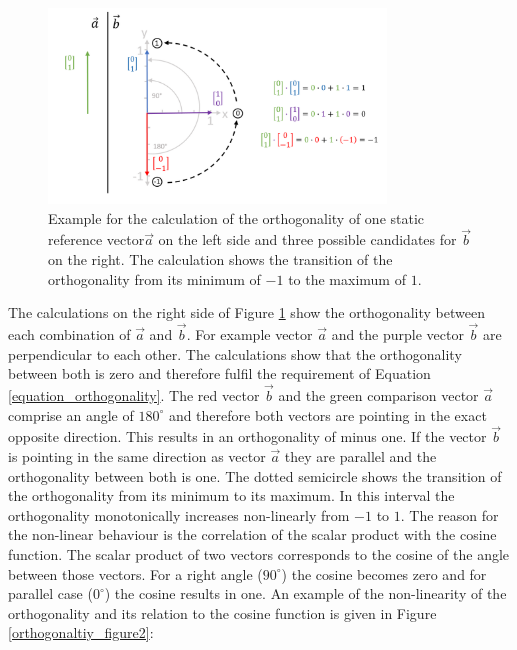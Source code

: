 \begin{figure}[H]
    \centering
    \includegraphics[width=0.8\textwidth]{Graphics/orthogonality.png}
    \caption{Example for the calculation of the orthogonality of one static reference vector$\overrightarrow{a}$ on the left side and three possible candidates for $\overrightarrow{b}$ on the right. The calculation shows the transition of the orthogonality from its minimum of $-1$ to the maximum of $1$.}
    \label{orthogonaltiy_figure}
\end{figure}

The calculations on the right side of Figure \ref{orthogonaltiy_figure} show the orthogonality between each combination of $\overrightarrow{a}$ and $\overrightarrow{b}$. For example vector $\overrightarrow{a}$ and the purple vector $\overrightarrow{b}$ are perpendicular to each other. The calculations show that the orthogonality between both is zero and therefore fulfil the requirement of Equation \ref{equation_orthogonality}. The red vector $\overrightarrow{b}$ and the green comparison vector $\overrightarrow{a}$ comprise an angle of $180^{\circ}$ and therefore both vectors are pointing in the exact opposite direction. This results in an orthogonality of minus one.
If the vector $\overrightarrow{b}$ is pointing in the same direction as vector $\overrightarrow{a}$ they are parallel and the orthogonality between both is one. The dotted semicircle shows the transition of the orthogonality from its minimum to its maximum. In this interval the orthogonality monotonically increases non-linearly from $-1$ to $1$. The reason for the non-linear behaviour is the correlation of the scalar product with the cosine function. The scalar product of two vectors corresponds to the cosine of the angle between those vectors. For a right angle ($90^{\circ}$) the cosine becomes zero and for parallel case ($0^{\circ}$) the cosine results in one. An example of the non-linearity of the orthogonality and its relation to the cosine function is given in Figure \ref{orthogonaltiy_figure2}:

